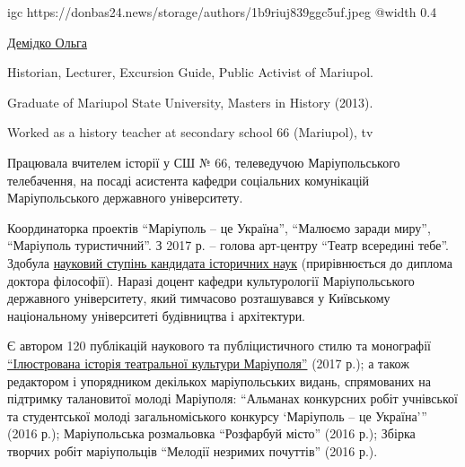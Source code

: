  
 
 
 
 


\ifcmt
  igc https://donbas24.news/storage/authors/1b9riuj839ggc5uf.jpeg
  @width 0.4
\fi

\href{https://donbas24.news/author/olga-demidko}{Демідко Ольга}

Historian, Lecturer, Excursion Guide, Public Activist of Mariupol.

Graduate of Mariupol State University, Masters in History (2013).

Worked as a history teacher at secondary school 66 (Mariupol), tv

Працювала вчителем історії у СШ № 66, телеведучою Маріупольського телебачення,
на посаді асистента кафедри соціальних комунікацій Маріупольського державного
університету.

Координаторка проектів \enquote{Маріуполь – це Україна}, \enquote{Малюємо
заради миру}, \enquote{Маріуполь туристичний}. З 2017 р. – голова арт-центру
\enquote{Театр всередині тебе}.  Здобула
\href{https://archive.org/details/book.2019.demidko_olga.mariupol.dissertacia}{науковий
ступінь кандидата історичних наук} (прирівнюється до диплома доктора
філософії). Наразі доцент кафедри культурології Маріупольського державного
університету, який тимчасово розташувався у Київському національному
університеті будівництва і архітектури.

Є автором 120 публікацій наукового та публіцистичного стилю та монографії
\href{https://archive.org/details/book.2017.demidko_olga.monografia.illustrovana_istoria_teatr_kultury_mariupolja}{%
\enquote{Ілюстрована історія театральної культури Маріуполя}} (2017 р.); а також
редактором і упорядником декількох маріупольських видань, спрямованих на
підтримку талановитої молоді Маріуполя: \enquote{Альманах конкурсних робіт учнівської
та студентської молоді загальноміського конкурсу \enquote{Маріуполь – це Україна}} (2016
р.); Маріупольська розмальовка \enquote{Розфарбуй місто} (2016 р.); Збірка творчих
робіт маріупольців \enquote{Мелодії незримих почуттів} (2016 р.). 

